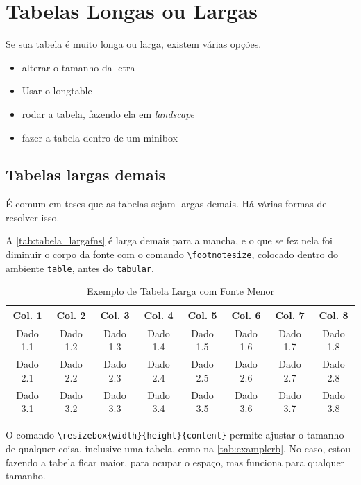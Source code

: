 \documentclass[dsc,pdfa]{coppe}
\begin{document}
\section{Tabelas Longas ou Largas}

Se sua tabela é muito longa ou larga, existem várias opções.
\begin{itemize}
    \item alterar o tamanho da letra
    \item Usar o longtable
    \item rodar a tabela, fazendo ela em \textit{landscape}
    \item fazer a tabela dentro de um minibox
\end{itemize}

\subsection{Tabelas largas demais}

É comum em teses que as tabelas sejam largas demais. Há várias formas de resolver isso.

A \autoref{tab:tabela_largafns} é larga demais para a mancha, e o que se fez nela foi diminuir o corpo da fonte com o comando \verb|\footnotesize|, colocado dentro do ambiente \verb|table|, antes do \verb|tabular|.

\begin{table}[ht]
\centering %
\caption{Exemplo de Tabela Larga com Fonte Menor}
\label{tab:tabela_largafns}
\footnotesize %
\begin{tabular}{cccccccc} %
\toprule
\textbf{Col. 1} & \textbf{Col. 2} & \textbf{Col. 3} & \textbf{Col. 4} & \textbf{Col. 5} & \textbf{Col. 6} & \textbf{Col. 7} & \textbf{Col. 8} \\
\midrule
Dado 1.1 & Dado 1.2 & Dado 1.3 & Dado 1.4 & Dado 1.5 & Dado 1.6 & Dado 1.7 & Dado 1.8 \\
Dado 2.1 & Dado 2.2 & Dado 2.3 & Dado 2.4 & Dado 2.5 & Dado 2.6 & Dado 2.7 & Dado 2.8 \\
Dado 3.1 & Dado 3.2 & Dado 3.3 & Dado 3.4 & Dado 3.5 & Dado 3.6 & Dado 3.7 & Dado 3.8 \\
\bottomrule
\end{tabular}
\end{table}

O comando \verb|\resizebox{width}{height}{content}| permite ajustar o tamanho de qualquer coisa, inclusive uma tabela, como na \autoref{tab:examplerb}. No caso, estou fazendo a tabela ficar maior, para ocupar o espaço, mas funciona para qualquer tamanho.
\end{document}
